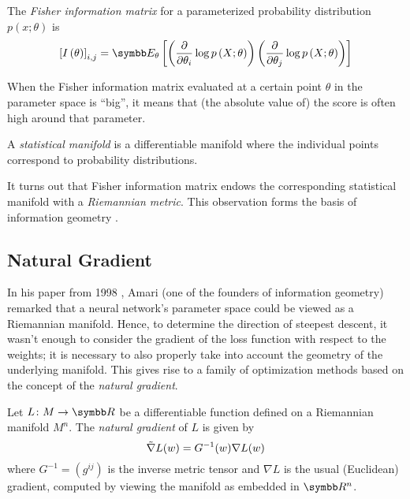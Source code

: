 \begin{definition}
The \emph{Fisher information matrix} for a parameterized probability distribution \(p(x; \theta)\) is
\[
    \left[I\left(\theta\right)\right]_{i, j} = \expectedvalue_{\theta} \left[\left(\frac{\partial}{\partial \theta_i} \log p\left(X; \theta\right)\right) \left(\frac{\partial}{\partial \theta_j} \log p\left(X; \theta\right)\right)\right]
\]
\end{definition}

When the Fisher information matrix evaluated at a certain point \(\theta\) in the parameter space is ``big'', it means that (the absolute value of) the score is often high around that parameter.

\begin{definition}
A \emph{statistical manifold} is a differentiable manifold where the individual points correspond to probability distributions.
\end{definition}

It turns out that Fisher information matrix endows the corresponding statistical manifold with a \emph{Riemannian metric}. This observation forms the basis of information geometry \cite{Amari2016}.

\subsection{Natural Gradient}

In his paper from 1998 \cite{Amari1998}, Amari (one of the founders of information geometry) remarked that a neural network's parameter space could be viewed as a Riemannian manifold. Hence, to determine the direction of steepest descent, it wasn't enough to consider the gradient of the loss function with respect to the weights; it is necessary to also properly take into account the geometry of the underlying manifold. This gives rise to a family of optimization methods based on the concept of the \emph{natural gradient}.



\begin{definition}
Let \(L \colon M \to \reals\) be a differentiable function defined on a Riemannian manifold \(M^n\). The \emph{natural gradient} of \(L\) is given by
\[
    \Tilde{\nabla} L (w) = G^{-1} (w) \nabla L (w)
\]
where \(G^{-1} = \left(g^{i j}\right)\) is the inverse metric tensor and \(\nabla L\) is the usual (Euclidean) gradient, computed by viewing the manifold as embedded in \(\reals^n\).
\end{definition}

